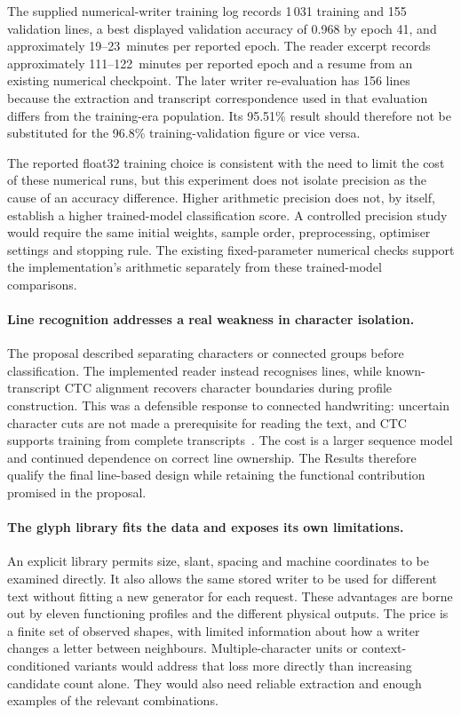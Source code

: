 The supplied numerical-writer training log records 1\,031 training and 155 validation lines, a best displayed validation accuracy of 0.968 by epoch 41, and approximately 19--23~minutes per reported epoch. The reader excerpt records approximately 111--122~minutes per reported epoch and a resume from an existing numerical checkpoint. The later writer re-evaluation has 156 lines because the extraction and transcript correspondence used in that evaluation differs from the training-era population. Its 95.51\% result should therefore not be substituted for the 96.8\% training-validation figure or vice versa.

The reported float32 training choice is consistent with the need to limit the cost of these numerical runs, but this experiment does not isolate precision as the cause of an accuracy difference. Higher arithmetic precision does not, by itself, establish a higher trained-model classification score. A controlled precision study would require the same initial weights, sample order, preprocessing, optimiser settings and stopping rule. The existing fixed-parameter numerical checks support the implementation's arithmetic separately from these trained-model comparisons.

\paragraph{Line recognition addresses a real weakness in character isolation.}
The proposal described separating characters or connected groups before classification. The implemented reader instead recognises lines, while known-transcript CTC alignment recovers character boundaries during profile construction. This was a defensible response to connected handwriting: uncertain character cuts are not made a prerequisite for reading the text, and CTC supports training from complete transcripts~\cite[PDF pp.~2--3]{graves2006}. The cost is a larger sequence model and continued dependence on correct line ownership. The Results therefore qualify the final line-based design while retaining the functional contribution promised in the proposal.

\paragraph{The glyph library fits the data and exposes its own limitations.}
An explicit library permits size, slant, spacing and machine coordinates to be examined directly. It also allows the same stored writer to be used for different text without fitting a new generator for each request. These advantages are borne out by eleven functioning profiles and the different physical outputs. The price is a finite set of observed shapes, with limited information about how a writer changes a letter between neighbours. Multiple-character units or context-conditioned variants would address that loss more directly than increasing candidate count alone. They would also need reliable extraction and enough examples of the relevant combinations.

